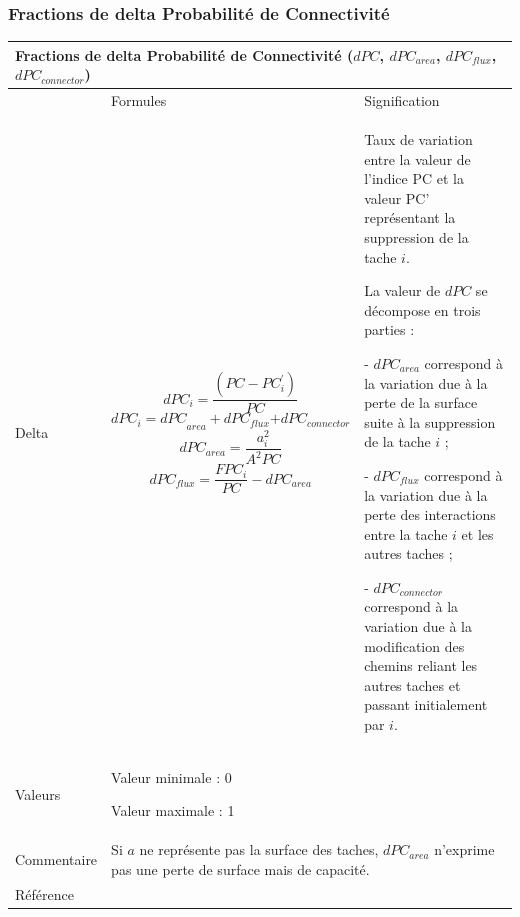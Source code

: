 \documentclass{article}
\begin{document}
\subsubsection{Fractions de delta Probabilité de Connectivité}
\label{metric_dPC}
\begin{table}[H]
\begin{tabular}{|m{2.2cm}|m{5.5cm}m{7.924cm}|}

\hline
\multicolumn{3}{|m{16.044998cm}|}{Fractions de delta Probabilité de Connectivité ($dPC$, $dPC_{area}$, $dPC_{flux}$, $dPC_{connector}$)}\\\hline
 &
\multicolumn{1}{m{5.229cm}|}{Formules} &
Signification\\\hline
Delta &
\multicolumn{1}{m{5.229cm}|}{\begin{equation*}
{\mathit{dPC}}_{i}=\frac{(\mathit{PC}-{\mathit{PC}}_{i}^{'})}{\mathit{PC}}
\end{equation*}
\begin{equation*}
{{\mathit{dPC}}_{i}=\mathit{dPC}}_{\mathit{area}}+{\mathit{dPC}}_{\mathit{flux}}{+\mathit{dPC}}_{\mathit{connector}}
\end{equation*}
\begin{equation*}
{\mathit{dPC}}_{\mathit{area}}=\frac{{a}_{i}^{2}}{{A}^{2}\mathit{PC}}
\end{equation*}
\begin{equation*}
{dPC}_{flux}=\frac{{FPC}_{i}}{PC}-{dPC}_{area}
\end{equation*}
} &
Taux de variation entre la valeur de l’indice PC et la valeur PC’ représentant la suppression de la tache $i$.

La valeur de $dPC$ se décompose en trois parties :

{}- $dPC_{area}$ correspond à la variation due à la perte de la surface suite à la suppression de la tache $i$ ;

{}- $dPC_{flux}$ correspond à la variation due à la perte des interactions entre la tache $i$ et les autres taches ;

{}- $dPC_{connector}$ correspond à la variation due à la modification des chemins reliant les autres taches et passant initialement par $i$.\\\hline
Valeurs &
\multicolumn{2}{m{13.353cm}|}{Valeur minimale : 0

Valeur maximale : 1

}\\\hline
Commentaire &
\multicolumn{2}{m{13.353cm}|}{
Si $a$ ne représente pas la surface des taches, $dPC_{area}$ n’exprime pas une perte de surface mais de capacité.

}\\\hline
Référence &
\multicolumn{2}{m{13.353cm}|}{\cite{Saura2010}}\\\hline
\end{tabular}
\end{table}
\end{document}
